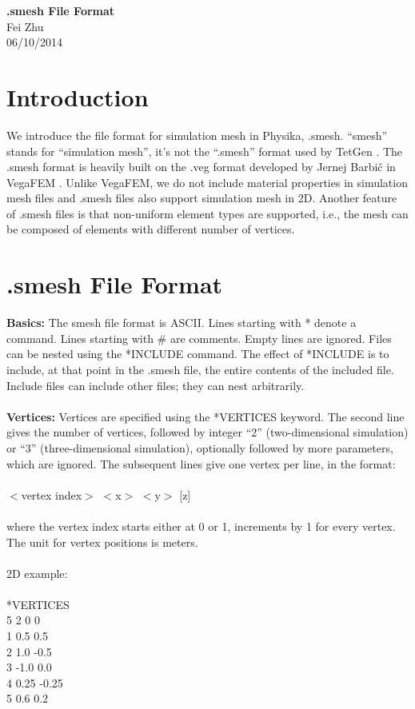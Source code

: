 \documentclass[11pt,fullpage]{article}
\begin{document}
\noindent
\begin{center}
{\bf .smesh File Format}
{\\ Fei Zhu \\ 06/10/2014}
\end{center}

\section{Introduction}

We introduce the file format for simulation mesh in Physika,
.smesh. ``smesh'' stands for ``simulation mesh'', it's not the
``.smesh'' format used by TetGen \cite{si2006}. The .smesh format is
heavily built on the .veg format developed by Jernej Barbi\v{c} in VegaFEM
\cite{vega}. Unlike VegaFEM, we do not include material properties in simulation
mesh files and .smesh files also support simulation mesh in
2D. Another feature of .smesh files is that non-uniform element types
are supported, i.e., the mesh can be composed of elements with
different number of vertices.

\section{.smesh File Format}

\textbf{Basics:} The smesh file format is ASCII. Lines starting with *
denote a command. Lines starting with
\# are comments. Empty lines are ignored. Files can be nested using
the *INCLUDE command. The effect of *INCLUDE is to include, at that
point in the .smesh file, the entire contents of the included
file. Include files can include other files; they can nest
arbitrarily.
\\\\
\noindent{}\textbf{Vertices:} Vertices are specified using the *VERTICES
keyword. The second line gives the number of vertices, followed by
integer ``2'' (two-dimensional simulation) or ``3'' (three-dimensional
simulation), optionally followed by more parameters, which are
ignored. The subsequent lines give one vertex per line, in the format:
\\\\
\noindent{}$<$vertex index$>$ $<$x$>$ $<$y$>$ [z]
\\\\
\noindent{}where the vertex index starts either at 0 or 1, increments by 1 for
every vertex. The unit for vertex positions is meters.
\\\\
\noindent{}2D example:
\\\\
\noindent{}*VERTICES\\
5 2 0 0\\
1 0.5 0.5\\
2 1.0 -0.5\\
3 -1.0 0.0\\
4 0.25 -0.25\\
5 0.6 0.2\\
\end{document}
